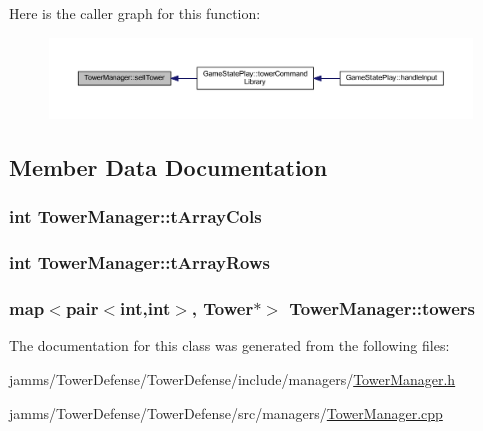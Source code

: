 Here is the caller graph for this function\+:
\nopagebreak
\begin{figure}[H]
\begin{center}
\leavevmode
\includegraphics[width=350pt]{class_tower_manager_afa7bbe1d178269f32df231807ab419d8_icgraph}
\end{center}
\end{figure}




\subsection{Member Data Documentation}
\hypertarget{class_tower_manager_a5c5df568b2ea8dd7220fed1d850c4050}{
\subsubsection[{t\+Array\+Cols}]{\setlength{\rightskip}{0pt plus 5cm}int Tower\+Manager\+::t\+Array\+Cols}}\label{class_tower_manager_a5c5df568b2ea8dd7220fed1d850c4050}
\hypertarget{class_tower_manager_a11ff48fe3d8fbaaeb2b0380893c35990}{
\subsubsection[{t\+Array\+Rows}]{\setlength{\rightskip}{0pt plus 5cm}int Tower\+Manager\+::t\+Array\+Rows}}\label{class_tower_manager_a11ff48fe3d8fbaaeb2b0380893c35990}
\hypertarget{class_tower_manager_aff1fd2b7123af1d48255ee4dfe19c637}{
\subsubsection[{towers}]{\setlength{\rightskip}{0pt plus 5cm}map$<$pair$<$int,int$>$, {\bf Tower}$\ast$$>$ Tower\+Manager\+::towers\hspace{0.3cm}{\ttfamily [private]}}}\label{class_tower_manager_aff1fd2b7123af1d48255ee4dfe19c637}


The documentation for this class was generated from the following files\+:\begin{DoxyCompactItemize}
\item 
jamms/\+Tower\+Defense/\+Tower\+Defense/include/managers/\hyperlink{_tower_manager_8h}{Tower\+Manager.\+h}\item 
jamms/\+Tower\+Defense/\+Tower\+Defense/src/managers/\hyperlink{_tower_manager_8cpp}{Tower\+Manager.\+cpp}\end{DoxyCompactItemize}
